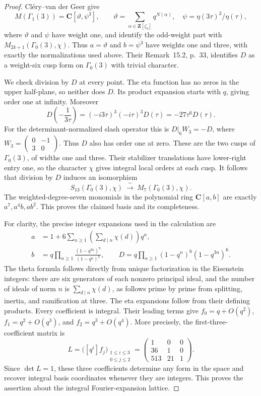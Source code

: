 \begin{proof}
Cl\'ery--van der Geer
\cite[paragraph on $\Gamma_1(3)$, p.~12]{K17CleryVanDerGeer2022}
give
\[
 M(\Gamma_1(3))=\mathbf C[\vartheta,\psi^3],\qquad
 \vartheta=\sum_{\alpha\in\mathbf Z[\zeta_3]}q^{N(\alpha)},\quad
 \psi=\eta(3\tau)^3/\eta(\tau),
\]
where $\vartheta$ and $\psi$ have weight one, and identify the odd-weight
part with $M_{2k+1}(\Gamma_0(3),\chi)$. Thus $a=\vartheta$ and $b=\psi^3$
have weights one and three, with exactly the normalizations used above.
Their Remark~15.2, p.~33, identifies $D$ as a weight-six cusp form on
$\Gamma_0(3)$ with trivial character.

We check division by $D$ at every point. The eta function has no zeros
in the upper half-plane, so neither does $D$. Its product expansion starts
with $q$, giving order one at infinity. Moreover
\[
 D\!\left(-\frac1{3\tau}\right)
 =(-i3\tau)^3(-i\tau)^3D(\tau)
 =-27\tau^6D(\tau).
\]
For the determinant-normalized slash operator this is
$D|_6W_3=-D$, where
$W_3=\left(\begin{smallmatrix}0&-1\\3&0\end{smallmatrix}\right)$.
Thus $D$ also has order one at zero. These are the two cusps of
$\Gamma_0(3)$, of widths one and three. Their stabilizer translations
have lower-right entry one, so the character $\chi$ gives integral local
orders at each cusp. It follows that division by $D$ induces an
isomorphism
\[
 S_{13}(\Gamma_0(3),\chi)\ \xrightarrow{\ \sim\ }\
 M_7(\Gamma_0(3),\chi).
\]
The weighted-degree-seven monomials in the polynomial ring
$\mathbf C[a,b]$ are exactly $a^7,a^4b,ab^2$. This proves the claimed
basis and its completeness.

For clarity, the precise integer expansions used in the calculation are
\begin{align}
 a&=1+6\sum_{n\ge1}\left(\sum_{d\mid n}\chi(d)\right)q^n,
 \label{eq:gl2-theta-expansion}\\
 b&=q\prod_{n\ge1}\frac{(1-q^{3n})^9}{(1-q^n)^3},\qquad
 D=q\prod_{n\ge1}(1-q^n)^6(1-q^{3n})^6.
 \label{eq:gl2-eta-expansion}
\end{align}
The theta formula follows directly from unique factorization in the
Eisenstein integers: there are six generators of each nonzero principal
ideal, and the number of ideals of norm $n$ is
$\sum_{d\mid n}\chi(d)$, as follows prime by prime from splitting,
inertia, and ramification at three. The eta expansions follow from their
defining products. Every coefficient is integral. Their leading terms
give $f_0=q+O(q^2)$, $f_1=q^2+O(q^3)$, and
$f_2=q^3+O(q^4)$. More precisely, the first-three-coefficient matrix is
\[
 L=\bigl([q^i]f_j\bigr)_{\substack{1\le i\le3\\0\le j\le2}}
   =\begin{pmatrix}1&0&0\\36&1&0\\513&21&1\end{pmatrix}.
\]
Since $\det L=1$, these three coefficients determine any form in the
space and recover integral basis coordinates whenever they are integers.
This proves the assertion about the integral Fourier-expansion lattice.


\end{proof}
